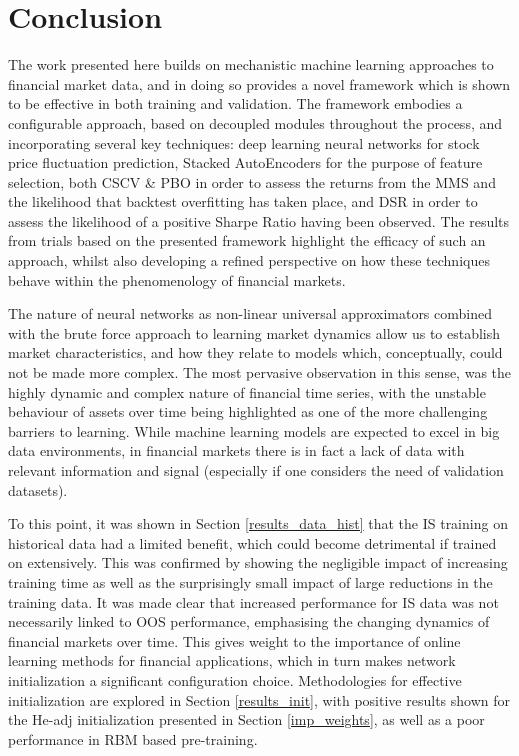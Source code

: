\documentclass[a4paper,11pt,oneside]{article}
\theoremstyle{plain}
\theoremstyle{definition}
\begin{document}
	
	
	
	
	\newpage
	\section{Conclusion}\label{Conclusion}
	
	The work presented here builds on mechanistic machine learning approaches to financial market data, and in doing so provides a novel framework which is shown to be effective in both training and validation. The framework embodies a configurable approach, based on decoupled modules throughout the process, and incorporating several key techniques: deep learning neural networks for stock price fluctuation prediction, Stacked AutoEncoders for the purpose of feature selection, both CSCV \& PBO in order to assess the returns from the MMS and the likelihood that backtest overfitting has taken place, and DSR in order to assess the likelihood of a positive Sharpe Ratio having been observed. The results from trials based on the presented framework highlight the efficacy of such an approach, whilst also developing a refined perspective on how these techniques behave within the phenomenology of financial markets.\newline 
	
	The nature of neural networks as non-linear universal approximators combined with the brute force approach to learning market dynamics allow us to establish market characteristics, and how they relate to models which, conceptually, could not be made more complex. The most pervasive observation in this sense, was the highly dynamic and complex nature of financial time series, with the unstable behaviour of assets over time being highlighted as one of the more challenging barriers to learning. While machine learning models are expected to excel in big data environments, in financial markets there is in fact a lack of data with relevant information and signal (especially if one considers the need of validation datasets). \newline
	
	To this point, it was shown in Section \ref{results_data_hist} that the IS training on historical data had a limited benefit, which could become detrimental if trained on extensively. This was confirmed by showing the negligible impact of increasing training time as well as the surprisingly small impact of large reductions in the training data. It was made clear that increased performance for IS data was not necessarily linked to OOS performance, emphasising the changing dynamics of financial markets over time. This gives weight to the importance of online learning methods for financial applications, which in turn makes network initialization a significant configuration choice. Methodologies for effective initialization are explored in Section \ref{results_init}, with positive results shown for the He-adj initialization presented in Section \ref{imp_weights}, as well as a poor performance in RBM based pre-training.  \newline
	
\end{document}
